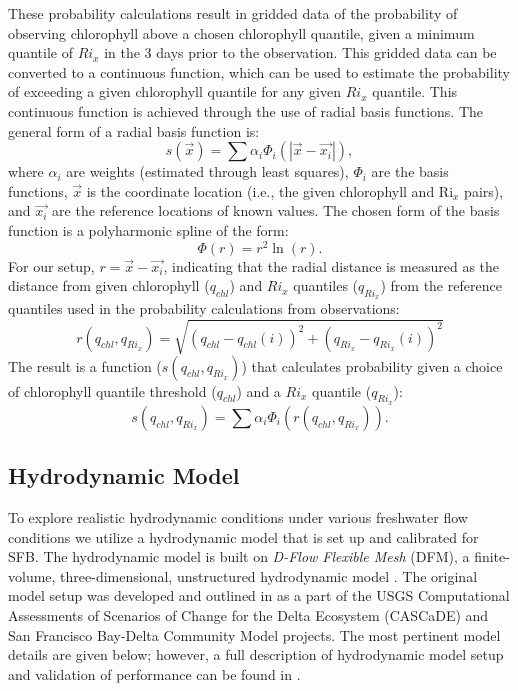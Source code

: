 \documentclass[preprint,review,12pt]{elsarticle}
\begin{document}
These probability calculations result in gridded data of the probability of observing chlorophyll above a chosen chlorophyll quantile, given a minimum quantile of \(Ri_x\) in the 3 days prior to the observation. This gridded data can be converted to a continuous function, which can be used to estimate the probability of exceeding a given chlorophyll quantile for any given \(Ri_x\) quantile. This continuous function is achieved through the use of radial basis functions. The general form of a radial basis function is: 
\begin{equation}\label{eq:rbf}
    s(\vec{x}) = \sum \alpha_i \Phi_i ( |\vec{x} - \vec{x_i}|),
\end{equation}
where \(\alpha_i\) are weights (estimated through least squares), \(\Phi_i\) are the basis functions, \(\vec{x}\) is the coordinate location (i.e., the given chlorophyll and Ri\(_x\) pairs), and \(\vec{x_i}\) are the reference locations of known values. 
The chosen form of the basis function is a polyharmonic spline of the form:
\begin{equation}\label{Phi}
    \Phi (r) = r^2 \ln(r).
\end{equation}
For our setup, \(r = \vec{x} - \vec{x_i}\), indicating that the radial distance is measured as the distance from given chlorophyll (\(q_{chl}\)) and \(Ri_x\) quantiles (\(q_{Ri_x}\)) from the reference quantiles used in the probability calculations from observations:
\begin{equation}\label{eq:distance}
    r(q_{chl}, q_{Ri_x}) = \sqrt{(q_{chl}-q_{chl}(i))^2 + (q_{Ri_x}-q_{Ri_x}(i))^2}
\end{equation}
The result is a function (\(s(q_{chl}, q_{Ri_x})\)) that calculates probability given a choice of chlorophyll quantile threshold (\(q_{chl}\)) and a \(Ri_x\) quantile (\(q_{Ri_x}\)):
\begin{equation}\label{eq:full_rbf}
    s(q_{chl}, q_{Ri_x}) = \sum \alpha_i \Phi_i ( r(q_{chl}, q_{Ri_x})).
\end{equation}

\subsection{Hydrodynamic Model}\label{S:model}
To explore realistic hydrodynamic conditions under various freshwater flow conditions we utilize a hydrodynamic model that is set up and calibrated for SFB. The hydrodynamic model is built on {\em D-Flow Flexible Mesh} (DFM), a finite-volume, three-dimensional, unstructured hydrodynamic model \citep{martyr2017}. The original model setup was developed and outlined in \cite{pubben2017} as a part of the USGS Computational Assessments of Scenarios of Change for the Delta Ecosystem (CASCaDE) and San Francisco Bay-Delta Community Model projects. The most pertinent model details are given below; however, a full description of hydrodynamic model setup and validation of performance can be found in \cite{holleman2017}. 
\end{document}
